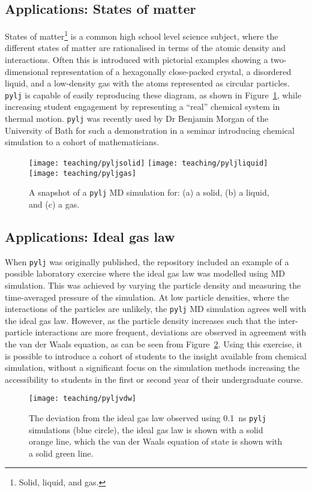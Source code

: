 \subsection{Applications: States of matter}
States of matter\footnote{Solid, liquid, and gas.} is a common high school level science subject, where the different states of matter are rationalised in terms of the atomic density and interactions.
Often this is introduced with pictorial examples showing a two-dimensional representation of a hexagonally close-packed crystal, a disordered liquid, and a low-density gas with the atoms represented as circular particles.
\texttt{pylj} is capable of easily reproducing these diagram, as shown in Figure~\ref{fig:matter}, while increasing student engagement by representing a ``real'' chemical system in thermal motion.
\texttt{pylj} was recently used by Dr Benjamin Morgan of the University of Bath for such a demonstration in a seminar introducing chemical simulation to a cohort of mathematicians.
%
\begin{figure}[t]
    \centering
    \texttt{[image: teaching/pyljsolid]}
    \texttt{[image: teaching/pyljliquid]}
    \texttt{[image: teaching/pyljgas]}
    \caption{A snapshot of a \texttt{pylj} MD simulation for: (a) a solid, (b) a liquid, and (c) a gas.}
    \label{fig:matter}
\end{figure}
%

\subsection{Applications: Ideal gas law}
When \texttt{pylj} was originally published,\autocite{mccluskey_pylj_2018} the repository included an example of a possible laboratory exercise where the ideal gas law was modelled using MD simulation.
This was achieved by varying the particle density and measuring the time-averaged pressure of the simulation.
At low particle densities, where the interactions of the particles are unlikely, the \texttt{pylj} MD simulation agrees well with the ideal gas law.
However, as the particle density increases such that the inter-particle interactions are more frequent, deviations are observed in agreement with the van der Waals equation, as can be seen from Figure~\ref{fig:vdw}.
Using this exercise, it is possible to introduce a cohort of students to the insight available from chemical simulation, without a significant focus on the simulation methods increasing the accessibility to students in the first or second year of their undergraduate course.
%
\begin{figure}[b]
    \centering
    \texttt{[image: teaching/pyljvdw]}
    \caption{The deviation from the ideal gas law observed using \SI{0.1}{\nano\second} \texttt{pylj} simulations (blue circle), the ideal gas law is shown with a solid orange line, which the van der Waals equation of state is shown with a solid green line.}
    \label{fig:vdw}
\end{figure}
%

